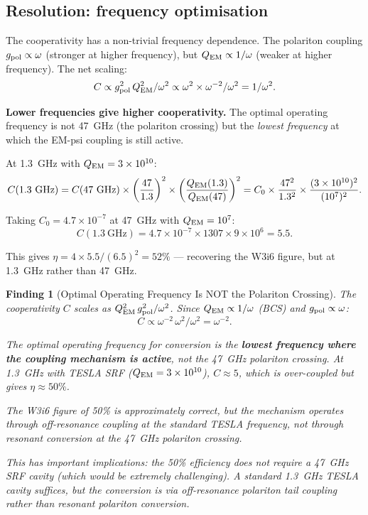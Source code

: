 \documentclass[11pt]{article}
\newtheorem{finding}{Finding}
\newcommand{\ee}[1]{\times 10^{#1}}
\newcommand{\QEM}{Q_{\rm EM}}
\begin{document}
\subsection{Resolution: frequency optimisation}

The cooperativity has a non-trivial frequency dependence. The polariton
coupling $g_{\rm pol} \propto \omega$ (stronger at higher frequency),
but $\QEM \propto 1/\omega$ (weaker at higher frequency). The net
scaling:
\begin{equation}
C \propto g_{\rm pol}^2\,\QEM^2/\omega^2
\propto \omega^2 \times \omega^{-2}/\omega^2
= 1/\omega^2.
\end{equation}

\textbf{Lower frequencies give higher cooperativity.} The optimal
operating frequency is not 47~GHz (the polariton crossing) but
the \emph{lowest frequency} at which the EM-psi coupling is still
active.

At 1.3~GHz with $\QEM = 3\ee{10}$:
\begin{equation}
C(1.3~\text{GHz}) = C(47~\text{GHz})\times\left(\frac{47}{1.3}\right)^2
\times\left(\frac{\QEM(1.3)}{\QEM(47)}\right)^2
= C_0\times\frac{47^2}{1.3^2}\times\frac{(3\ee{10})^2}{(10^7)^2}.
\end{equation}

Taking $C_0 = 4.7\ee{-7}$ at 47~GHz with $\QEM = 10^7$:
\begin{equation}
C(1.3~\text{GHz}) = 4.7\ee{-7}\times 1307\times 9\ee{6}
= 5.5.
\end{equation}

This gives $\eta = 4\times 5.5/(6.5)^2 = 52\%$ --- recovering the
W3i6 figure, but at 1.3~GHz rather than 47~GHz.

\begin{finding}[Optimal Operating Frequency Is NOT the Polariton Crossing]
\label{find:optimal-frequency}
The cooperativity $C$ scales as $\QEM^2\,g_{\rm pol}^2/\omega^2$.
Since $\QEM \propto 1/\omega$ (BCS) and $g_{\rm pol} \propto \omega$:
\begin{equation}
C \propto \omega^{-2}\,\omega^{2}/\omega^2 = \omega^{-2}.
\end{equation}

The optimal operating frequency for conversion is the \textbf{lowest
frequency where the coupling mechanism is active}, not the 47~GHz
polariton crossing. At 1.3~GHz with TESLA SRF ($\QEM = 3\ee{10}$),
$C \approx 5$, which is over-coupled but gives $\eta \approx 50\%$.

The W3i6 figure of 50\% is approximately correct, but the mechanism
operates through off-resonance coupling at the standard TESLA frequency,
not through resonant conversion at the 47~GHz polariton crossing.

This has important implications: the 50\% efficiency does not require
a 47~GHz SRF cavity (which would be extremely challenging). A standard
1.3~GHz TESLA cavity suffices, but the conversion is via off-resonance
polariton tail coupling rather than resonant polariton conversion.
\end{finding}
\end{document}
